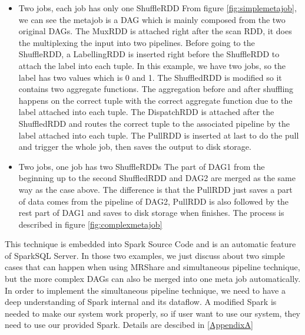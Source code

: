 \begin{itemize}
\item Two jobs, each job has only one ShuffleRDD
From figure \ref{fig:simplemetajob}, we can see the metajob is a DAG which is mainly composed from the two original DAGs. The MuxRDD is attached right after the scan RDD, it does the multiplexing the input into two pipelines. Before going to the ShuffleRDD, a LabellingRDD is inserted right before the ShuffleRDD to attach the label into each tuple. In this example, we have two jobs, so the label has two values which is 0 and 1. The ShuffledRDD is modified so it contains two aggregate functions. The aggregation before and after shuffling happens on the correct tuple with the correct aggregate function due to the label attached into each tuple. The DispatchRDD is attached after the ShuffledRDD and routes the correct tuple to the associated pipeline by the label attached into each tuple. The PullRDD is inserted at last to do the pull and trigger the whole job, then saves the output to disk storage.
\item Two jobs, one job has two ShuffleRDDs
The part of DAG1 from the beginning up to the second ShuffledRDD and DAG2 are merged as the same way as the case above. The difference is that the PullRDD just saves a part of data comes from the pipeline of DAG2, PullRDD is also followed by the rest part of DAG1 and saves to disk storage when finishes. The process is described in figure \ref{fig:complexmetajob}
\end{itemize}

This technique is embedded into Spark Source Code and is an automatic feature of SparkSQL Server. In those two examples, we just discuss about two simple cases that can happen when using MRShare and simultaneous pipeline technique, but the more complex DAGs can also be merged into one meta job automatically.\\

In order to implement the simultaneous pipeline technique, we need to have a deep understanding of Spark internal and its dataflow. A modified Spark is needed to make our system work properly, so if user want to use our system, they need to use our provided Spark. Details are descibed in \ref{AppendixA}